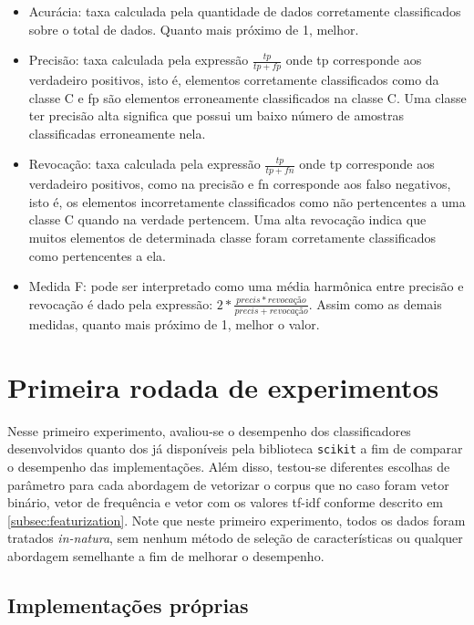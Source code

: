 \begin{itemize}
	\item Acurácia: taxa calculada pela quantidade de dados corretamente classificados
	sobre o total de dados. Quanto mais próximo de 1, melhor.
	\item Precisão: taxa calculada pela expressão $\frac{tp}{tp + fp}$ onde tp corresponde
	aos verdadeiro positivos, isto é, elementos corretamente classificados como da classe C
	e fp são elementos erroneamente classificados na classe C. Uma classe ter precisão alta
	significa que possui um baixo número de amostras classificadas erroneamente nela.
	\item Revocação: taxa calculada pela expressão $\frac{tp}{tp + fn}$ onde tp corresponde
	aos verdadeiro positivos, como na precisão e fn corresponde
	aos falso negativos, isto é, os elementos incorretamente classificados como não pertencentes
	a uma classe C quando na verdade pertencem. Uma alta revocação indica que muitos elementos
	de determinada classe foram corretamente classificados como pertencentes a ela.
	\item Medida F: pode ser interpretado como uma média harmônica entre precisão e revocação é dado
	pela expressão: $2*\frac{precis*revocação}{precis + revocação}$. Assim como as demais medidas, quanto
	mais próximo de 1, melhor o valor.
\end{itemize}

\section{Primeira rodada de experimentos}

Nesse primeiro experimento, avaliou-se o desempenho dos classificadores desenvolvidos quanto dos
já disponíveis pela biblioteca \texttt{scikit} a fim de comparar o desempenho das implementações.
Além disso, testou-se diferentes escolhas de parâmetro para cada abordagem de vetorizar o corpus
que no caso foram vetor binário, vetor de frequência e vetor com os valores tf-idf conforme descrito
em \ref{subsec:featurization}. 
Note que neste primeiro experimento, todos os dados foram tratados \textit{in-natura}, sem nenhum método de seleção de características ou qualquer abordagem semelhante a fim de melhorar o desempenho.

\subsection{Implementações próprias}

